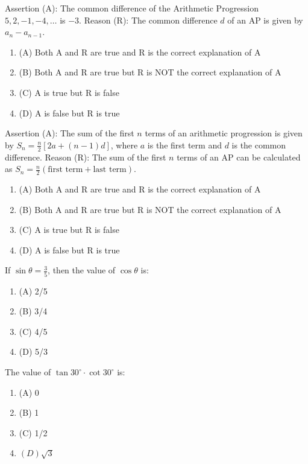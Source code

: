\documentclass[12pt,a4paper]{exam}
\begin{document}
\begin{questions}
\question[1] Assertion (A): The common difference of the Arithmetic Progression $5, 2, -1, -4, \dots$ is $-3$. Reason (R): The common difference $d$ of an AP is given by $a_{n} - a_{n-1}$.
\begin{enumerate}[label=(\Alph*)]
  \item (A) Both A and R are true and R is the correct explanation of A
  \item (B) Both A and R are true but R is NOT the correct explanation of A
  \item (C) A is true but R is false
  \item (D) A is false but R is true
\end{enumerate}
\vspace{0.15cm}

\question[1] Assertion (A): The sum of the first $n$ terms of an arithmetic progression is given by $S_n = \frac{n}{2}[2a + (n-1)d]$, where $a$ is the first term and $d$ is the common difference.
Reason (R): The sum of the first $n$ terms of an AP can be calculated as $S_n = \frac{n}{2}(\text{first term} + \text{last term})$.
\begin{enumerate}[label=(\Alph*)]
  \item (A) Both A and R are true and R is the correct explanation of A
  \item (B) Both A and R are true but R is NOT the correct explanation of A
  \item (C) A is true but R is false
  \item (D) A is false but R is true
\end{enumerate}
\vspace{0.15cm}

\question[1] If $\sin \theta = \frac{3}{5}$, then the value of $\cos \theta$ is:
\begin{enumerate}[label=(\Alph*)]
  \item (A) 2/5
  \item (B) 3/4
  \item (C) 4/5
  \item (D) 5/3
\end{enumerate}
\vspace{0.15cm}

\question[1] The value of $\tan 30^\circ \cdot \cot 30^\circ$ is:
\begin{enumerate}[label=(\Alph*)]
  \item (A) 0
  \item (B) 1
  \item (C) 1/2
  \item $(D) \sqrt{3}$
\end{enumerate}
\vspace{0.15cm}


\end{questions}
\end{document}
